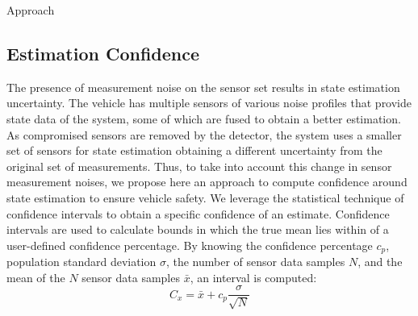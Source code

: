 \begin{section}{Approach}

	

\subsection{Estimation Confidence} 

\label{sec:estimation_confidence}

The presence of measurement noise on the sensor set results in state estimation uncertainty. The vehicle has multiple sensors of various noise profiles that provide state data of the system, some of which are fused to obtain a better estimation. As compromised sensors are removed by the detector, the system uses a smaller set of sensors for state estimation obtaining a different uncertainty from the original set of measurements. Thus, to take into account this change in sensor measurement noises, we propose here an approach to compute confidence around state estimation to ensure vehicle safety. 
We leverage the statistical technique of confidence intervals \cite{devore2011probability} to obtain a specific confidence of an estimate. Confidence intervals are used to calculate bounds in which the true mean lies within of a user-defined confidence percentage. By knowing the confidence percentage $c_p$, population standard deviation $\sigma$, the number of sensor data samples $N$, and the mean of the $N$ sensor data samples $\bar{x}$, an interval is computed:
    \begin{equation}
     \label{Confidence_interval}
		C_x = \bar{x} + c_p\frac{\sigma}{\sqrt{N}}
	\end{equation}
	

\end{section}
